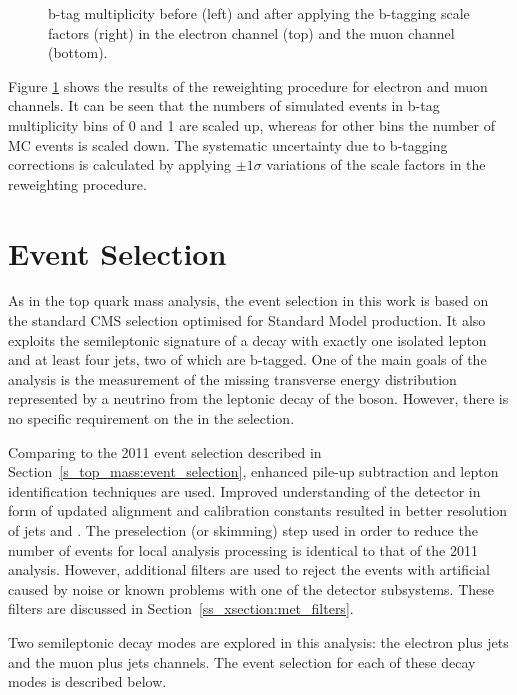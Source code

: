 \begin{figure}[!htpb]
    \caption[b-tag multiplicity before and after applying the b-tagging scale factors]{b-tag multiplicity before (left)
    and after applying the b-tagging scale factors (right) in the electron channel (top) and the muon channel (bottom).}
    \label{fig:bjet_weights}
\end{figure}

Figure \ref{fig:bjet_weights} shows the results of the reweighting procedure for electron and muon channels. It can be
seen that the numbers of simulated events in b-tag multiplicity bins of \num{0} and \num{1} are scaled up, whereas for
other bins the number of MC events is scaled down. The systematic uncertainty due to b-tagging corrections is calculated
by applying $\pm 1 \sigma$ variations of the scale factors in the reweighting procedure.

\section{Event Selection}
\label{s_xsection:event_selection}
As in the top quark mass analysis, the event selection in this work is based on the standard CMS selection optimised for
Standard Model \ttbar production. It also exploits the semileptonic signature of a \ttbar decay with exactly one
isolated lepton and at least four jets, two of which are b-tagged. One of the main goals of the analysis is the
measurement of the missing transverse energy distribution represented by a neutrino from the leptonic decay of the \W
boson. However, there is no specific requirement on the \MET in the selection.

Comparing to the 2011 event selection described in Section~\ref{s_top_mass:event_selection}, enhanced pile-up
subtraction and lepton identification techniques are used. Improved understanding of the detector in form of updated
alignment and calibration constants resulted in better resolution of jets and \MET. The preselection (or skimming) step
used in order to reduce the number of events for local analysis processing is identical to that of the 2011 analysis.
However, additional filters are used to reject the events with artificial \MET caused by noise or known problems with
one of the detector subsystems. These filters are discussed in Section~\ref{ss_xsection:met_filters}.

Two semileptonic \ttbar decay modes are explored in this analysis: the electron plus jets and the muon plus jets
channels. The event selection for each of these decay modes is described below.

